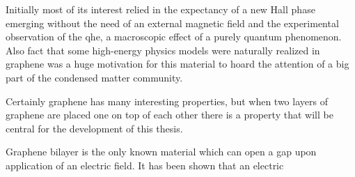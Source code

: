 Initially most of its interest relied in the expectancy of a new Hall phase emerging without the need of an external magnetic field\cite{Kane2005a,Ostrovsky2008} and the experimental observation of the \ac{qhe}, a macroscopic effect of a purely quantum phenomenon\cite{Zhang2005}.
Also fact that some high-energy physics models were naturally realized in graphene was a huge motivation for this material to hoard the attention of a big part of the condensed matter community.

Certainly graphene has many interesting properties, but when two layers of graphene are placed one on top of each other there is a property that will be central for the development of this thesis.

Graphene bilayer is the only known material which can open a gap upon application of an electric field. It has been shown that an electric




